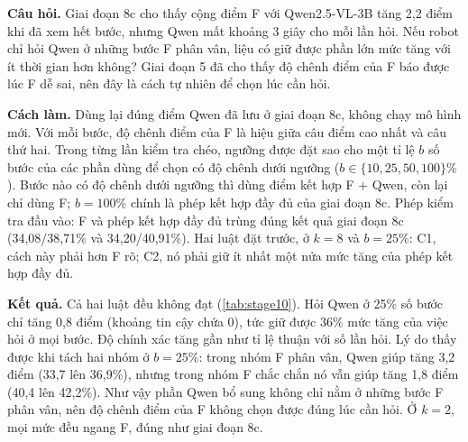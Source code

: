 \documentclass[a4paper,oneside]{report}
\begin{document}
\textbf{Câu hỏi.} Giai đoạn 8c cho thấy cộng điểm F với Qwen2.5-VL-3B tăng 2,2 điểm khi đã xem hết bước, nhưng Qwen mất khoảng 3 giây cho mỗi lần hỏi. Nếu robot chỉ hỏi Qwen ở những bước F phân vân, liệu có giữ được phần lớn mức tăng với ít thời gian hơn không? Giai đoạn 5 đã cho thấy độ chênh điểm của F báo được lúc F dễ sai, nên đây là cách tự nhiên để chọn lúc cần hỏi.

\textbf{Cách làm.} Dùng lại đúng điểm Qwen đã lưu ở giai đoạn 8c, không chạy mô hình mới. Với mỗi bước, độ chênh điểm của F là hiệu giữa câu điểm cao nhất và câu thứ hai. Trong từng lần kiểm tra chéo, ngưỡng được đặt sao cho một tỉ lệ $b$ số bước của các phần dùng để chọn có độ chênh dưới ngưỡng ($b\in\{10, 25, 50, 100\}\%$). Bước nào có độ chênh dưới ngưỡng thì dùng điểm kết hợp F $+$ Qwen, còn lại chỉ dùng F; $b=100\%$ chính là phép kết hợp đầy đủ của giai đoạn 8c. Phép kiểm tra đầu vào: F và phép kết hợp đầy đủ trùng đúng kết quả giai đoạn 8c (34,08/38,71\% và 34,20/40,91\%). Hai luật đặt trước, ở $k=8$ và $b=25\%$: C1, cách này phải hơn F rõ; C2, nó phải giữ ít nhất một nửa mức tăng của phép kết hợp đầy đủ.

\begin{table}[ht]
\centering
\caption{Giai đoạn 10: chỉ hỏi Qwen ở tỉ lệ $b$ số bước có độ chênh điểm của F thấp nhất, $k=8$ (chọn đúng mục đích trong 5 câu cùng video, \%, 2.503 bước, đoán mò 20\%). Thời gian Qwen tính trung bình cho mỗi bước.}
\label{tab:stage10}
\small
{}
\end{table}

\textbf{Kết quả.} Cả hai luật đều không đạt (\cref{tab:stage10}). Hỏi Qwen ở 25\% số bước chỉ tăng 0,8 điểm (khoảng tin cậy chứa 0), tức giữ được 36\% mức tăng của việc hỏi ở mọi bước. Độ chính xác tăng gần như tỉ lệ thuận với số lần hỏi. Lý do thấy được khi tách hai nhóm ở $b=25\%$: trong nhóm F phân vân, Qwen giúp tăng 3,2 điểm (33,7 lên 36,9\%), nhưng trong nhóm F chắc chắn nó vẫn giúp tăng 1,8 điểm (40,4 lên 42,2\%). Như vậy phần Qwen bổ sung không chỉ nằm ở những bước F phân vân, nên độ chênh điểm của F không chọn được đúng lúc cần hỏi. Ở $k=2$, mọi mức đều ngang F, đúng như giai đoạn 8c.
\end{document}

